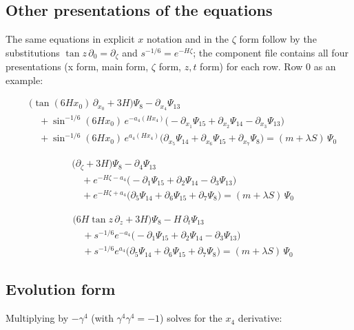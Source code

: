\documentclass[11pt]{article}
\begin{document}
\subsection{Other presentations of the equations}

The same equations in explicit $x$ notation and in the $\zeta$ form follow by the substitutions $\tan z\,\partial_0=\partial_\zeta$ and $s^{-1/6}=e^{-H\zeta}$; the component file contains all four presentations (x form, main form, $\zeta$ form, $z,t$ form) for each row. Row 0 as an example:

\[
\begin{aligned}
&\bigl(\tan(6Hx_0)\,\partial_{x_{0}}+3H\bigr)\Psi_{8}-\partial_{x_{4}}\Psi_{13} \\
&\quad +\sin^{-1/6}(6Hx_0)\,e^{-a_4(Hx_4)}\bigl(-\partial_{x_{1}}\Psi_{15}+\partial_{x_{2}}\Psi_{14}-\partial_{x_{3}}\Psi_{13}\bigr) \\
&\quad +\sin^{-1/6}(6Hx_0)\,e^{a_4(Hx_4)}\bigl(\partial_{x_{5}}\Psi_{14}+\partial_{x_{6}}\Psi_{15}+\partial_{x_{7}}\Psi_{8}\bigr)=(m+\lambda S)\,\Psi_{0}
\end{aligned}\tag{E0: x form}
\]

\[
\begin{aligned}
&\bigl(\partial_{\zeta}+3H\bigr)\Psi_{8}-\partial_{4}\Psi_{13} \\
&\quad +e^{-H\zeta-a_4}\bigl(-\partial_{1}\Psi_{15}+\partial_{2}\Psi_{14}-\partial_{3}\Psi_{13}\bigr) \\
&\quad +e^{-H\zeta+a_4}\bigl(\partial_{5}\Psi_{14}+\partial_{6}\Psi_{15}+\partial_{7}\Psi_{8}\bigr)=(m+\lambda S)\,\Psi_{0}
\end{aligned}\tag{E0: zeta form}
\]

\[
\begin{aligned}
&\bigl(6H\tan z\,\partial_{z}+3H\bigr)\Psi_{8}-H\,\partial_{t}\Psi_{13} \\
&\quad +s^{-1/6}e^{-a_4}\bigl(-\partial_{1}\Psi_{15}+\partial_{2}\Psi_{14}-\partial_{3}\Psi_{13}\bigr) \\
&\quad +s^{-1/6}e^{a_4}\bigl(\partial_{5}\Psi_{14}+\partial_{6}\Psi_{15}+\partial_{7}\Psi_{8}\bigr)=(m+\lambda S)\,\Psi_{0}
\end{aligned}\tag{E0: z, t form}
\]

\subsection{Evolution form}

Multiplying by $-\gamma^4$ (with $\gamma^4\gamma^4=-1$) solves for the $x_4$ derivative:
\end{document}
